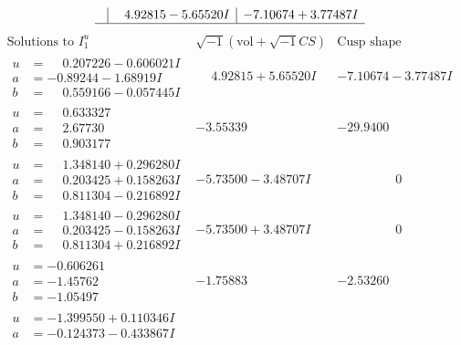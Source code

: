 \documentclass[1p]{elsarticle_modified}
\theoremstyle{definition}
\newcommand{\I}{\sqrt{-1}}
\begin{document}
$$\begin{array}{c|c|c}
 & \phantom{-}4.92815 - 5.65520 I & -7.10674 + 3.77487 I\\
 \hline 
 \end{array}$$\newpage$$\begin{array}{c|c|c}  
\text{Solutions to }I^u_{1}& \I (\text{vol} + \sqrt{-1}CS) & \text{Cusp shape}\\
 \hline 
\begin{aligned}
u &= \phantom{-}0.207226 - 0.606021 I \\
a &= -0.89244 - 1.68919 I \\
b &= \phantom{-}0.559166 - 0.057445 I\end{aligned}
 & \phantom{-}4.92815 + 5.65520 I & -7.10674 - 3.77487 I \\ \hline\begin{aligned}
u &= \phantom{-}0.633327\phantom{ +0.000000I} \\
a &= \phantom{-}2.67730\phantom{ +0.000000I} \\
b &= \phantom{-}0.903177\phantom{ +0.000000I}\end{aligned}
 & -3.55339\phantom{ +0.000000I} & -29.9400\phantom{ +0.000000I} \\ \hline\begin{aligned}
u &= \phantom{-}1.348140 + 0.296280 I \\
a &= \phantom{-}0.203425 + 0.158263 I \\
b &= \phantom{-}0.811304 - 0.216892 I\end{aligned}
 & -5.73500 - 3.48707 I & \phantom{-0.000000 } 0 \\ \hline\begin{aligned}
u &= \phantom{-}1.348140 - 0.296280 I \\
a &= \phantom{-}0.203425 - 0.158263 I \\
b &= \phantom{-}0.811304 + 0.216892 I\end{aligned}
 & -5.73500 + 3.48707 I & \phantom{-0.000000 } 0 \\ \hline\begin{aligned}
u &= -0.606261\phantom{ +0.000000I} \\
a &= -1.45762\phantom{ +0.000000I} \\
b &= -1.05497\phantom{ +0.000000I}\end{aligned}
 & -1.75883\phantom{ +0.000000I} & -2.53260\phantom{ +0.000000I} \\ \hline\begin{aligned}
u &= -1.399550 + 0.110346 I \\
a &= -0.124373 - 0.433867 I \\

\end{aligned}
\end{array}$$
\end{document}
